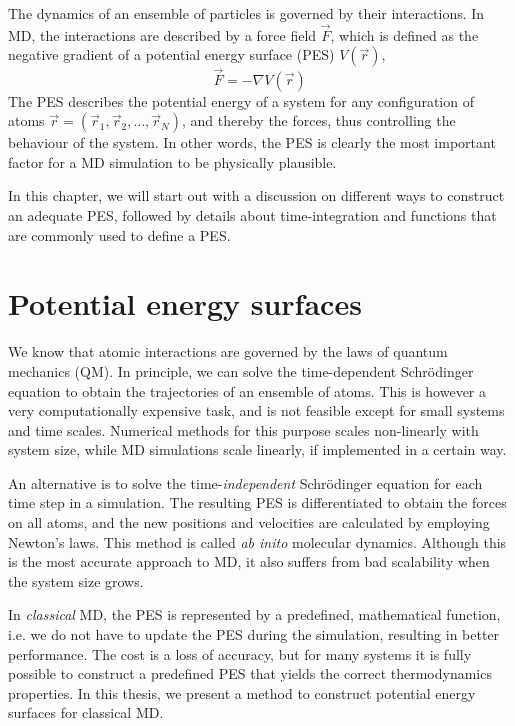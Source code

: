 \documentclass[twoside,english]{uiofysmaster}
\begin{document}
The dynamics of an ensemble of particles is governed by their interactions. 
In MD, the interactions are described
by a force field $\vec{F}$, which is defined as the negative gradient of a 
potential energy surface (PES) $V(\vec{r})$,
\begin{equation}
 \vec{F} = -\nabla V(\vec{r})
 \label{forcePES}
\end{equation}
The PES describes the potential energy of a system for any configuration of atoms 
$\vec{r} = (\vec{r}_1, \vec{r}_2, \dots, \vec{r}_N)$, and thereby the forces, thus
controlling the behaviour of the system. In other words, the PES is clearly the most important
factor for a MD simulation to be physically plausible. 

In this chapter, we will start out with a discussion on different ways to construct an adequate PES, followed 
by details about time-integration and functions that are commonly used to define a PES. 

\section{Potential energy surfaces} \label{sec:potentialEnergySurfaces}
We know that atomic interactions are governed by the laws of quantum mechanics (QM). 
In principle, we can solve the time-dependent Schr\"{o}dinger equation to obtain the trajectories of 
an ensemble of atoms. This is however a very computationally expensive task, and is not feasible except for
small systems and time scales. Numerical methods for this purpose scales non-linearly with system size, while
MD simulations scale linearly, if implemented in a certain way. 

An alternative is to solve the time-\textit{independent} Schr\"{o}dinger equation for each time step in a simulation. 
The resulting PES is differentiated to obtain the forces on all atoms, and the new positions and velocities are calculated
by employing Newton's laws. This method is called \textit{ab inito} molecular dynamics. Although this is the most accurate
approach to MD, it also suffers from bad scalability when the system size grows. 

In \textit{classical} MD, the PES is represented by a predefined, mathematical function, i.e. we do not have to 
update the PES during the simulation, resulting in better performance. The cost is a loss of accuracy, but for many 
systems it is fully possible to construct a predefined PES that yields the correct thermodynamics properties. 
In this thesis, we present a method to construct potential energy surfaces for classical MD.  
\end{document}
